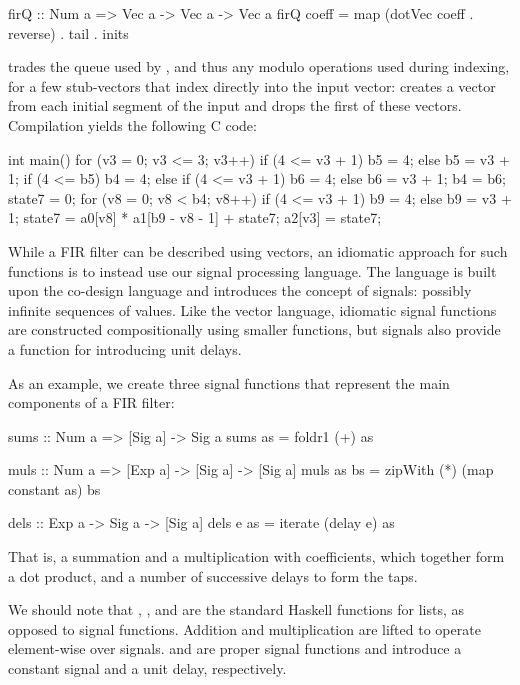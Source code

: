 \documentclass[../paper.tex]{subfiles}
\begin{document}
\begin{code}
firQ :: Num a => Vec a -> Vec a -> Vec a
firQ coeff = map (dotVec coeff . reverse) . tail . inits
\end{code}

 trades the queue used by , and thus any modulo operations used during indexing, for a few stub-vectors that index directly into the input vector:  creates a vector from each initial segment of the input and  drops the first of these vectors. Compilation yields the following C code:

\begin{code}
int main() {
  for (v3 = 0; v3 <= 3; v3++) {
    if (4 <= v3 + 1) { b5 = 4; } else { b5 = v3 + 1; }
    if (4 <= b5) { b4 = 4; }
    else {
      if (4 <= v3 + 1) { b6 = 4; } else { b6 = v3 + 1; }
      b4 = b6;
    }
    state7 = 0;
    for (v8 = 0; v8 < b4; v8++) {
      if (4 <= v3 + 1) { b9 = 4; } else { b9 = v3 + 1; }
      state7 = a0[v8] * a1[b9 - v8 - 1] + state7;
    }
    a2[v3] = state7;
  }
}
\end{code}

While a FIR filter can be described using vectors, an idiomatic approach for such functions is to instead use our signal processing language. The language is built upon the co-design language and introduces the concept of signals: possibly infinite sequences of values. Like the vector language, idiomatic signal functions are constructed compositionally using smaller functions, but signals also provide a function for introducing unit delays.

As an example, we create three signal functions that represent the main components of a FIR filter:

\begin{code}
sums :: Num a => [Sig a] -> Sig a
sums as = foldr1 (+) as

muls :: Num a => [Exp a] -> [Sig a] -> [Sig a]
muls as bs = zipWith (*) (map constant as) bs

dels :: Exp a -> Sig a -> [Sig a]
dels e as = iterate (delay e) as
\end{code}

\noindent That is, a summation and a multiplication with coefficients, which together form a dot product, and a number of successive delays to form the taps.

We should note that , ,  and  are the standard Haskell functions for lists, as opposed to signal functions. Addition and multiplication are lifted to operate element-wise over signals.  and  are proper signal functions and introduce a constant signal and a unit delay, respectively.
\end{document}
